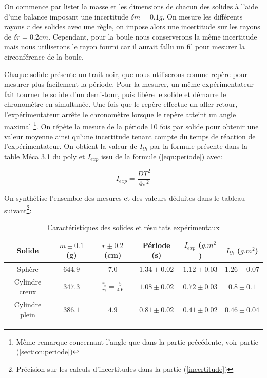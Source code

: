\documentclass[11pt]{article}
\begin{document}
On commence par lister la masse et les dimensions de chacun des solides à l'aide d'une balance imposant une incertitude $\delta m = 0.1g$.
On mesure les différents rayons $r$ des solides avec une règle, on impose alors une incertitude sur les rayons de $\delta r = 0.2cm$. Cependant, pour la boule nous conserverons
la même incertitude mais nous utiliserons le rayon fourni car il aurait fallu un fil pour mesurer la circonférence de la boule.

Chaque solide présente un trait noir, que nous utiliserons comme repère pour mesurer plus facilement la période. Pour la mesurer,
un même expérimentateur fait tourner le solide d'un demi-tour, puis libère le solide et démarre le chronomètre en simultanée. 
Une fois que le repère effectue un aller-retour, l'expérimentateur arrête le chronomètre lorsque 
le repère atteint un angle maximal \footnote{Même remarque concernant l'angle que dans la partie précédente, voir partie (\ref{section:periode})}.
On répète la mesure de la période 10 fois par solide pour obtenir une valeur moyenne ainsi qu'une incertitude tenant compte du temps de réaction
de l'expérimentateur. On obtient la valeur de $I_{th}$ par la formule présente dans la table Méca 3.1 du poly et $I_{exp}$ issu de la formule (\ref{eqn:periode}) avec:

\begin{equation}
    I_{exp} = \frac{DT^2}{4\pi^2} 
\end{equation}

On synthétise l'ensemble des mesures et des valeurs déduites dans le tableau suivant\footnote{Précision sur les calculs d'incertitudes dans la partie (\ref{incertitude})}:

\begin{table}[h!]
	\centering
	\begin{tabular}{||c c c c c c||} 
		\hline
		Solide          & $m \pm 0.1$ (g)  & $r \pm 0.2$ (cm)  & Période (s) & $I_{exp}$ ($g.m^2$)& $I_{th}$ ($g.m^2$)\\
		\hline
        Sphère          & $644.9$ & $7.0$ & $1.34 \pm 0.02$ & $1.12 \pm 0.03$ & $1.26 \pm 0.07$ \\
        Cylindre creux  & $347.3$ & $\frac{r_e}{r_i} = \frac{5}{4.6}$ & $1.08 \pm 0.02$ & $0.72 \pm 0.03$ & $0.8 \pm 0.1$ \\
        Cylindre plein  & $386.1$ & $4.9$ & $0.81 \pm 0.02$ & $0.41 \pm 0.02$ & $0.46 \pm 0.04$ \\
		\hline
	\end{tabular}
	\caption{Caractéristiques des solides et résultats expérimentaux}
	\label{table:1}
\end{table}
\end{document}
